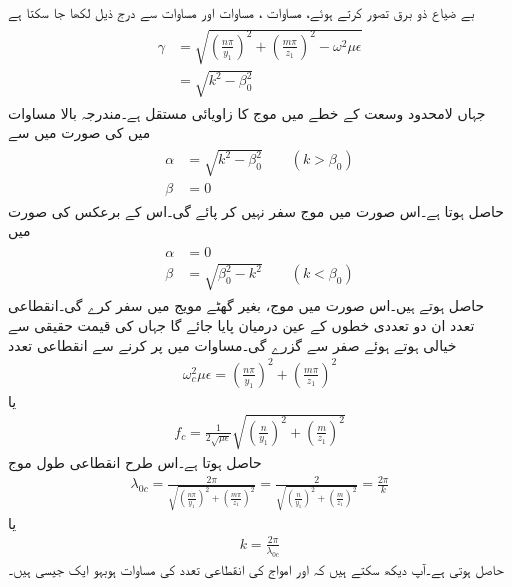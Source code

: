 بے ضیاع ذو برق  تصور کرتے ہوئے، مساوات ،  مساوات  اور مساوات  سے درج ذیل لکھا جا سکتا ہے
\begin{gather}
\begin{aligned}\label{مساوات_مویج_عرضی_مقناطیسی_مستقل_موج}
\gamma&=\sqrt{\left(\frac{n\pi}{y_1}\right)^2+\left(\frac{m\pi}{z_1}\right)^2-\omega^2 \mu \epsilon}\\
&=\sqrt{k^2-\beta_0^2}
\end{aligned}
\end{gather}
جہاں  لامحدود وسعت کے خطے میں موج کا زاویائی مستقل  ہے۔مندرجہ بالا مساوات میں  کی صورت میں  سے
\begin{gather}
\begin{aligned}\label{مساوات_مویج_تضعیفی_مستقل_الف}
\alpha&=\sqrt{k^2-\beta_0^2}  \quad \quad (k>\beta_0)\\
\beta &=0
\end{aligned}
\end{gather}
حاصل ہوتا ہے۔اس صورت میں موج سفر نہیں کر پائے گی۔اس کے برعکس  کی صورت میں
\begin{gather}
\begin{aligned}\label{مساوات_مویج_زاویائی_مستقل_الف}
\alpha&=0\\
\beta &= \sqrt{\beta_0^2-k^2}  \quad \quad (k<\beta_0)
\end{aligned}
\end{gather}
حاصل ہوتے ہیں۔اس صورت میں موج، بغیر گھٹے مویج میں سفر کرے گی۔انقطاعی تعدد ان دو تعددی خطوں کے عین درمیان پایا جائے گا جہاں  کی قیمت حقیقی سے خیالی ہوتے ہوئے صفر سے گزرے گی۔مساوات  میں  پر کرنے سے انقطاعی تعدد
\begin{align}
\omega_c^2 \mu \epsilon =\left(\frac{n\pi}{y_1}\right)^2+\left(\frac{m\pi}{z_1}\right)^2
\end{align}
یا
\begin{align}
f_c =\frac{1}{2 \sqrt{\mu \epsilon}}\sqrt{\left(\frac{n}{y_1}\right)^2+\left(\frac{m}{z_1}\right)^2}
\end{align}
حاصل ہوتا ہے۔اس طرح انقطاعی طول موج
\begin{align}\label{مساوات_مویج_مستطیلی_انقطاعی_طول}
\lambda_{0c}=\frac{2\pi}{\sqrt{\left(\frac{n\pi}{y_1}\right)^2+\left(\frac{m\pi}{z_1}\right)^2}}=\frac{2}{\sqrt{\left(\frac{n}{y_1}\right)^2+\left(\frac{m}{z_1}\right)^2}}=\frac{2\pi}{k}
\end{align}
یا
\begin{align}
k=\frac{2\pi}{\lambda_{0c}}
\end{align}
حاصل ہوتی ہے۔آپ دیکھ سکتے ہیں کہ  اور  امواج کی انقطاعی تعدد کی مساوات ہوبہو ایک جیسی ہیں۔

